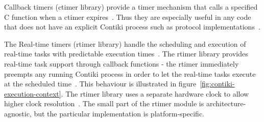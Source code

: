 Callback timers (ctimer library) provide a timer mechanism that calls a specified
C function when a ctimer expires~\cite{contiki-docs}.
Thus they are especially useful in any code that does not have an
explicit Contiki process such as protocol implementations~\cite{contiki-wiki-timers}.

The Real-time timers (rtimer library) handle the scheduling and execution of
real-time tasks with predictable execution times~\cite{contiki-docs}.
The rtimer library provides real-time task support through callback functions -
the rtimer immediately preempts any running Contiki process in order to let the real-time tasks
execute at the scheduled time~\cite{contiki-wiki-timers}.
This behaviour is illustrated in figure~\ref{fig:contiki-execution-context}.
The rtimer library uses a separate hardware clock
to allow higher clock resolution~\cite{contiki-wiki-timers}.
The small part of the rtimer module is architecture-agnostic,
but the particular implementation is platform-specific.
